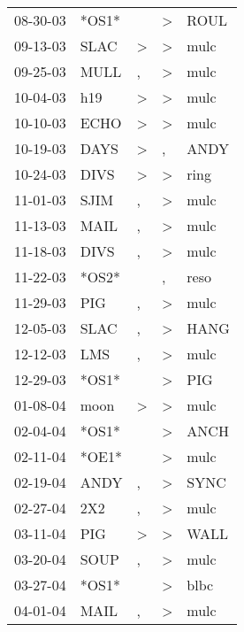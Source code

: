 \begin{supertabular}{lllll}
 08-30-03 &  *OS1* &                  &     \textgreater &   ROUL \\
 09-13-03 &   SLAC &     \textgreater &     \textgreater &   mulc \\
 09-25-03 &   MULL &                , &     \textgreater &   mulc \\
 10-04-03 &    h19 &     \textgreater &     \textgreater &   mulc \\
 10-10-03 &   ECHO &     \textgreater &     \textgreater &   mulc \\
 10-19-03 &   DAYS &     \textgreater &                , &   ANDY \\
 10-24-03 &   DIVS &     \textgreater &     \textgreater &   ring \\
 11-01-03 &   SJIM &                , &     \textgreater &   mulc \\
 11-13-03 &   MAIL &                , &     \textgreater &   mulc \\
 11-18-03 &   DIVS &                , &     \textgreater &   mulc \\
 11-22-03 &  *OS2* &                  &                , &   reso \\
 11-29-03 &    PIG &                , &     \textgreater &   mulc \\
 12-05-03 &   SLAC &                , &     \textgreater &   HANG \\
 12-12-03 &    LMS &                , &     \textgreater &   mulc \\
 12-29-03 &  *OS1* &                  &     \textgreater &    PIG \\
 01-08-04 &   moon &     \textgreater &     \textgreater &   mulc \\
 02-04-04 &  *OS1* &                  &     \textgreater &   ANCH \\
 02-11-04 &  *OE1* &                  &     \textgreater &   mulc \\
 02-19-04 &   ANDY &                , &     \textgreater &   SYNC \\
 02-27-04 &    2X2 &                , &     \textgreater &   mulc \\
 03-11-04 &    PIG &     \textgreater &     \textgreater &   WALL \\
 03-20-04 &   SOUP &                , &     \textgreater &   mulc \\
 03-27-04 &  *OS1* &                  &     \textgreater &   blbc \\
 04-01-04 &   MAIL &                , &     \textgreater &   mulc \\

\end{supertabular}
